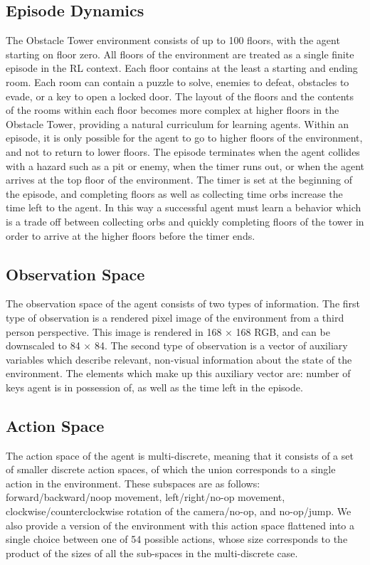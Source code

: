 \documentclass[conference]{IEEEtran}
\begin{document}
\subsection{\textbf{Episode Dynamics}}
The Obstacle Tower environment consists of up to 100 floors, with the agent starting on floor zero. All floors of the environment are treated as a single finite episode in the RL context. Each floor contains at the least a starting and ending room. Each room can contain a puzzle to solve, enemies to defeat, obstacles to evade, or a key to open a locked door. The layout of the floors and the contents of the rooms within each floor becomes more complex at higher floors in the Obstacle Tower, providing a natural curriculum for learning agents. Within an episode, it is only possible for the agent to go to higher floors of the environment, and not to return to lower floors.
The episode terminates when the agent collides with a hazard such as a pit or enemy, when the timer runs out, or when the agent arrives at the top floor of the environment. The timer is set at the beginning of the episode, and completing floors as well as collecting time orbs increase the time left to
the agent. In this way a successful agent must learn a behavior which is a trade off between collecting orbs and quickly completing floors of the tower in order to arrive at the higher floors before the timer ends.

\subsection{\textbf{Observation Space}}
The observation space of the agent consists of two types of information. The first type of observation is a rendered pixel image of the environment from a third person perspective.
This image is rendered in 168 × 168 RGB, and can be downscaled to 84 × 84. The second type of observation is a vector of auxiliary variables which describe relevant, non-visual information about the state of the environment. The elements which make up this auxiliary vector are: number of keys agent is in possession of, as well as the time left in the episode.

\subsection{\textbf{Action Space}}
The action space of the agent is multi-discrete, meaning that it consists of a set of smaller discrete action spaces, of which the union corresponds to a single action in the environment. These subspaces are as follows: forward/backward/noop movement, left/right/no-op movement, clockwise/counterclockwise rotation of the camera/no-op, and no-op/jump. We also provide a version of the environment with this action space flattened into a single choice between one of 54 possible actions, whose size corresponds to the product of the sizes of all the sub-spaces in the multi-discrete case.
\end{document}
